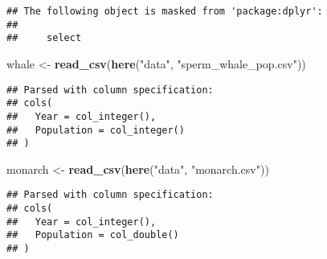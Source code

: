 \documentclass[]{article}
\newenvironment{Shaded}{\begin{snugshade}}{\end{snugshade}}
\newcommand{\KeywordTok}[1]{\textcolor[rgb]{0.13,0.29,0.53}{\textbf{#1}}}
\newcommand{\NormalTok}[1]{#1}
\newcommand{\StringTok}[1]{\textcolor[rgb]{0.31,0.60,0.02}{#1}}
\begin{document}
\begin{verbatim}
## The following object is masked from 'package:dplyr':
## 
##     select
\end{verbatim}

\begin{Shaded}
\begin{Highlighting}[]
\NormalTok{whale <-}\StringTok{ }\KeywordTok{read_csv}\NormalTok{(}\KeywordTok{here}\NormalTok{(}\StringTok{"data"}\NormalTok{, }\StringTok{"sperm_whale_pop.csv"}\NormalTok{))}
\end{Highlighting}
\end{Shaded}

\begin{verbatim}
## Parsed with column specification:
## cols(
##   Year = col_integer(),
##   Population = col_integer()
## )
\end{verbatim}

\begin{Shaded}
\begin{Highlighting}[]
\NormalTok{monarch <-}\StringTok{ }\KeywordTok{read_csv}\NormalTok{(}\KeywordTok{here}\NormalTok{(}\StringTok{"data"}\NormalTok{, }\StringTok{"monarch.csv"}\NormalTok{))}
\end{Highlighting}
\end{Shaded}

\begin{verbatim}
## Parsed with column specification:
## cols(
##   Year = col_integer(),
##   Population = col_double()
## )
\end{verbatim}
\end{document}
